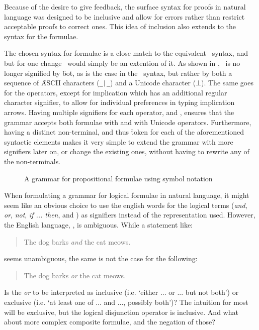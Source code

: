 \documentclass[BA.tex]{subfiles}
\begin{document}
Because of the desire to give feedback, the surface syntax for proofs in
natural language was designed to be inclusive and allow for errors rather
than restrict acceptable proofs to correct ones. This idea of inclusion
also extends to the syntax for the formulae.

The chosen syntax for formulae is a close match to the equivalent
 \bp\ syntax, and but for one change \ours\ would simply be an extention
 of it. As shown in , \abs\ is no longer signified by
 \f{bot}, as is the case in the \bp\ syntax, but rather by both a sequence 
 of \f{ASCII} characters (\verb+_|_+) and a Unicode character (\(\bot\)). 
 The same goes for the operators, except for implication which has an
 additional regular character signifier, to allow for individual preferences
 in typing implication arrows. Having multiple signifiers for each
 operator, and , ensures that the grammar
 accepts both formulae with  and with Unicode operators.
 Furthermore, having a distinct non-terminal, and thus \f{token}
 for each of the aforementioned syntactic elements makes it
 very simple to extend the grammar with more signifiers later on, or change
 the existing ones, without having to rewrite any of the  
 non-terminals.

\begin{figure}[!hb]

\caption{A grammar for propositional formulae using symbol notation}
\label{nlform}
\end{figure}

When formulating a grammar for logical formulae in natural language, it
 might seem like an obvious choice to use the english words
 for the logical terms
 (\emph{and}, \emph{or}, \emph{not}, \emph{if ... then},  and \emph{\abs})
 as signifiers instead of the  representation used. However, 
 the English language, , is
 ambiguous. While a statement like:
 \begin{quote}
    The dog barks \emph{and} the cat meows.
 \end{quote}
 seems unambiguous, the same is not the case for the following:
 \begin{quote}
    The dog barks \emph{or} the cat meows.
 \end{quote}
 Is the \emph{or} to be interpreted as inclusive 
 (i.e. `either ... or ... but not both') or exclusive
 (i.e. `at least one of ... and ..., possibly both')? 
 The intuition for most will be exclusive, but the logical disjunction
 operator is inclusive. And what about more complex composite formulae,
 and the negation of those? 
 
\end{document}
